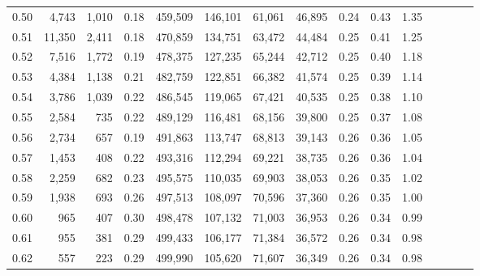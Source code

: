 \begin{tabular}{rrrcrrrrrrrrrrr}
0.50 &   4,743 &  1,010 &                                       0.18 &  459,509 &  146,101 &   61,061 &   46,895 &  0.24 &  0.43 &                         1.35 \\
0.51 &  11,350 &  2,411 &                                       0.18 &  470,859 &  134,751 &   63,472 &   44,484 &  0.25 &  0.41 &                         1.25 \\
0.52 &   7,516 &  1,772 &                                       0.19 &  478,375 &  127,235 &   65,244 &   42,712 &  0.25 &  0.40 &                         1.18 \\
0.53 &   4,384 &  1,138 &                                       0.21 &  482,759 &  122,851 &   66,382 &   41,574 &  0.25 &  0.39 &                         1.14 \\
0.54 &   3,786 &  1,039 &                                       0.22 &  486,545 &  119,065 &   67,421 &   40,535 &  0.25 &  0.38 &                         1.10 \\
0.55 &   2,584 &    735 &                                       0.22 &  489,129 &  116,481 &   68,156 &   39,800 &  0.25 &  0.37 &                         1.08 \\
0.56 &   2,734 &    657 &                                       0.19 &  491,863 &  113,747 &   68,813 &   39,143 &  0.26 &  0.36 &                         1.05 \\
0.57 &   1,453 &    408 &                                       0.22 &  493,316 &  112,294 &   69,221 &   38,735 &  0.26 &  0.36 &                         1.04 \\
0.58 &   2,259 &    682 &                                       0.23 &  495,575 &  110,035 &   69,903 &   38,053 &  0.26 &  0.35 &                         1.02 \\
0.59 &   1,938 &    693 &                                       0.26 &  497,513 &  108,097 &   70,596 &   37,360 &  0.26 &  0.35 &                         1.00 \\
0.60 &     965 &    407 &                                       0.30 &  498,478 &  107,132 &   71,003 &   36,953 &  0.26 &  0.34 &                         0.99 \\
0.61 &     955 &    381 &                                       0.29 &  499,433 &  106,177 &   71,384 &   36,572 &  0.26 &  0.34 &                         0.98 \\
0.62 &     557 &    223 &                                       0.29 &  499,990 &  105,620 &   71,607 &   36,349 &  0.26 &  0.34 &                         0.98 \\

\end{tabular}
